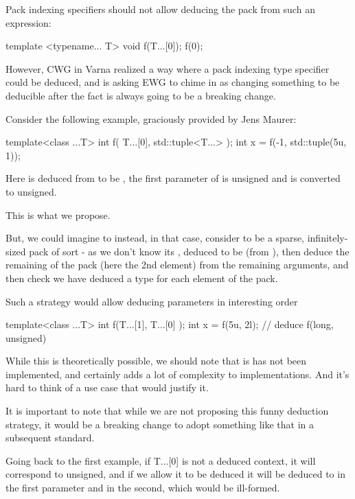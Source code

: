 \documentclass{wg21}
\begin{document}
Pack indexing specifiers should not allow deducing the pack from such an expression:

\begin{colorblock}
template <typename... T>
void f(T...[0]);
f(0);
\end{colorblock}

However, CWG in Varna realized a way where a pack indexing type specifier could be deduced, and is asking EWG to chime in
as changing something to be deducible after the fact is always going to be a breaking change.

Consider the following example, graciously provided by Jens Maurer:
\begin{colorblock}
template<class ...T>
int f( T...[0], std::tuple<T...> );
int x = f(-1, std::tuple(5u, 1));
\end{colorblock}

Here  is deduced from  to be ,
the first parameter of  is unsigned and  is converted to unsigned.

This is what we propose.

But, we could imagine to instead, in that case, consider 
to be a sparse, infinitely-sized pack of sort - as we don't know its ,
deduced  to be  (from ),
then deduce the remaining of the pack (here the 2nd element) from the
remaining arguments, and then check we have deduced a type for each
element of the pack.

Such a strategy would allow deducing parameters in interesting order

\begin{colorblock}
template<class ...T>
int f(T...[1],  T...[0] );
int x = f(5u, 2l); // deduce f(long, unsigned)
\end{colorblock}

While this is theoretically possible, we should note that is has not been implemented,
and certainly adds a lot of complexity to implementations.
And it's hard to think of a use case that would justify it.

It is important to note that while we are not proposing this
funny deduction strategy, it would be a breaking change to adopt something like that
in a subsequent standard.


Going back to the first example, if T...[0] is not a deduced context,
it will correspond to unsigned, and if we allow it to be deduced it will be deduced to 
in the first parameter and in the second, which would be ill-formed.
\end{document}
